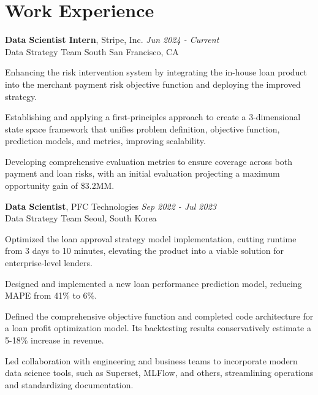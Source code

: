 \section{\mysidestyle Work Experience}

\textbf{Data Scientist Intern}, Stripe, Inc. \hfill \textsl{Jun 2024 - Current}\\
Data Strategy Team \hfill South San Francisco, CA

\begin{list2}
    \item {Enhancing the risk intervention system by integrating the in-house loan product into the merchant payment risk objective function and deploying the improved strategy.}
    \item {Establishing and applying a first-principles approach to create a 3-dimensional state space framework that unifies problem definition, objective function, prediction models, and metrics, improving scalability.}
    \item {Developing comprehensive evaluation metrics to ensure coverage across both payment and loan risks, with an initial evaluation projecting a maximum opportunity gain of \$3.2MM.}
\end{list2}

\textbf{Data Scientist}, PFC Technologies \hfill \textsl{Sep 2022 - Jul 2023}\\
Data Strategy Team \hfill Seoul, South Korea

\begin{list2}
    \item {Optimized the loan approval strategy model implementation, cutting runtime from 3 days to 10 minutes, elevating the product into a viable solution for enterprise-level lenders.}
    \item {Designed and implemented a new loan performance prediction model, reducing MAPE from 41\% to 6\%.}
    \item {Defined the comprehensive objective function and completed code architecture for a loan profit optimization model. Its backtesting results conservatively estimate a 5-18\% increase in revenue.}
    \item {Led collaboration with engineering and business teams to incorporate modern data science tools, such as Superset, MLFlow, and others, streamlining operations and standardizing documentation.}
\end{list2}

